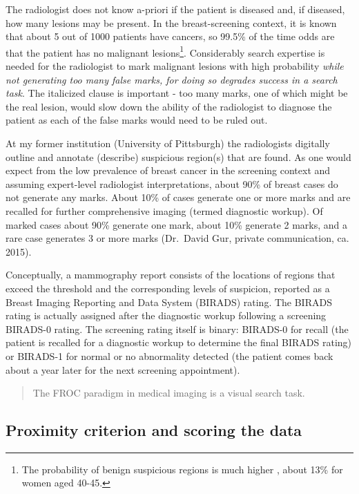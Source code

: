 \documentclass[
]{book}
\begin{document}
The radiologist does not know a-priori if the patient is diseased and, if diseased, how many lesions may be present. In the breast-screening context, it is known that about 5 out of 1000 patients have cancers, so 99.5\% of the time odds are that the patient has no malignant lesions\footnote{The probability of benign suspicious regions is much higher \citep{Ernster1981Epidemiology}, about 13\% for women aged 40-45.}. Considerably search expertise is needed for the radiologist to mark malignant lesions with high probability \emph{while not generating too many false marks, for doing so degrades success in a search task}. The italicized clause is important - too many marks, one of which might be the real lesion, would slow down the ability of the radiologist to diagnose the patient as each of the false marks would need to be ruled out.

At my former institution (University of Pittsburgh) the radiologists digitally outline and annotate (describe) suspicious region(s) that are found. As one would expect from the low prevalence of breast cancer in the screening context and assuming expert-level radiologist interpretations, about 90\% of breast cases do not generate any marks. About 10\% of cases generate one or more marks and are recalled for further comprehensive imaging (termed diagnostic workup). Of marked cases about 90\% generate one mark, about 10\% generate 2 marks, and a rare case generates 3 or more marks (Dr.~David Gur, private communication, ca. 2015).

Conceptually, a mammography report consists of the locations of regions that exceed the threshold and the corresponding levels of suspicion, reported as a Breast Imaging Reporting and Data System (BIRADS) rating. The BIRADS rating is actually assigned after the diagnostic workup following a screening BIRADS-0 rating. The screening rating itself is binary: BIRADS-0 for recall (the patient is recalled for a diagnostic workup to determine the final BIRADS rating) or BIRADS-1 for normal or no abnormality detected (the patient comes back about a year later for the next screening appointment).

\begin{quote}
The FROC paradigm in medical imaging is a visual search task.
\end{quote}

\hypertarget{froc-paradigm-scoring-the-data}{%
\subsection{Proximity criterion and scoring the data}\label{froc-paradigm-scoring-the-data}}
\end{document}
